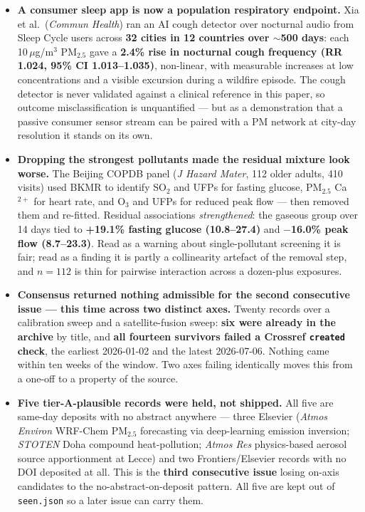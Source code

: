 \documentclass[10pt]{article}
\begin{document}
\begin{itemize}
\item \textbf{A consumer sleep app is now a population respiratory endpoint.} Xia et al.\
(\textit{Commun Health}) ran an AI cough detector over nocturnal audio from Sleep Cycle
users across \textbf{32 cities in 12 countries over ${\sim}$500 days}: each 10\,$\mu$g/m$^3$
PM$_{2.5}$ gave a \textbf{2.4\% rise in nocturnal cough frequency (RR 1.024, 95\% CI
1.013--1.035)}, non-linear, with measurable increases at low concentrations and a visible
excursion during a wildfire episode. The cough detector is never validated against a
clinical reference in this paper, so outcome misclassification is unquantified --- but as
a demonstration that a passive consumer sensor stream can be paired with a PM network at
city-day resolution it stands on its own.

\item \textbf{Dropping the strongest pollutants made the residual mixture look worse.}
The Beijing COPDB panel (\textit{J Hazard Mater}, 112 older adults, 410 visits) used BKMR
to identify SO$_2$ and UFPs for fasting glucose, PM$_{2.5}$ Ca$^{2+}$ for heart rate, and
O$_3$ and UFPs for reduced peak flow --- then removed them and re-fitted. Residual
associations \emph{strengthened}: the gaseous group over 14 days tied to
\textbf{+19.1\% fasting glucose (10.8--27.4)} and \textbf{$-$16.0\% peak flow (8.7--23.3)}.
Read as a warning about single-pollutant screening it is fair; read as a finding it is
partly a collinearity artefact of the removal step, and $n=112$ is thin for pairwise
interaction across a dozen-plus exposures.

\item \textbf{Consensus returned nothing admissible for the second consecutive issue ---
this time across two distinct axes.} Twenty records over a calibration sweep and a
satellite-fusion sweep: \textbf{six were already in the archive} by title, and
\textbf{all fourteen survivors failed a Crossref \texttt{created} check}, the earliest
2026-01-02 and the latest 2026-07-06. Nothing came within ten weeks of the window. Two
axes failing identically moves this from a one-off to a property of the source.

\item \textbf{Five tier-A-plausible records were held, not shipped.} All five are
same-day deposits with no abstract anywhere --- three Elsevier (\textit{Atmos Environ}
WRF-Chem PM$_{2.5}$ forecasting via deep-learning emission inversion; \textit{STOTEN} Doha
compound heat-pollution; \textit{Atmos Res} physics-based aerosol source apportionment at
Lecce) and two Frontiers/Elsevier records with no DOI deposited at all. This is the
\textbf{third consecutive issue} losing on-axis candidates to the no-abstract-on-deposit
pattern. All five are kept out of \texttt{seen.json} so a later issue can carry them.
\end{itemize}
\end{document}
